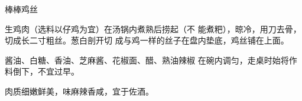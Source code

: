 \begin{recipe}{棒棒鸡丝}

\ingredients


\cooking

\step 生鸡肉（选料以仔鸡为宜）在汤锅内煮熟后捞起（不 能煮粑），晾冷，用刀去骨，切成长二寸粗丝。葱白剖开切 成与鸡一样的丝子在盘内垫底，鸡丝铺在上面。

\step 酱油、白糖、香油、芝麻酱、花椒面、醋、熟油辣椒 在碗内调匀，走桌时始将作料倒下，不宜过早。

\notes

肉质细嫩鲜美，味麻辣香咸，宜于佐酒。

\end{recipe}

